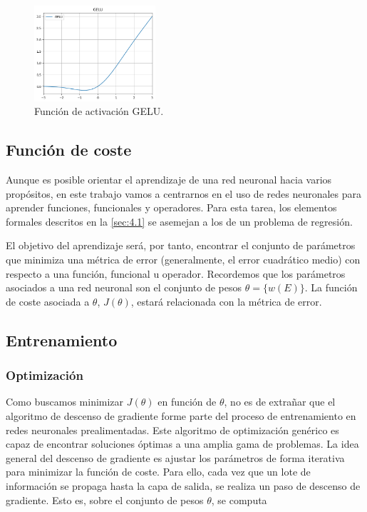 \begin{itemize}
    \begin{figure}[htbp]
        \centering
        \includegraphics[width=0.4\textwidth]{img/img25.png}
        \caption{Función de activación GELU.}
        \label{fig:img25}
    \end{figure}
\end{itemize}

\subsection{Función de coste}

Aunque es posible orientar el aprendizaje de una red neuronal hacia varios propósitos, en este trabajo vamos a centrarnos en el uso de redes neuronales para aprender funciones, funcionales y operadores. Para esta tarea, los elementos formales descritos en la \autoref{sec:4.1} se asemejan a los de un problema de regresión.

El objetivo del aprendizaje será, por tanto, encontrar el conjunto de parámetros que minimiza una métrica de error (generalmente, el error cuadrático medio) con respecto a una función, funcional u operador. Recordemos que los parámetros asociados a una red neuronal son el conjunto de pesos $\theta = \{ w(E) \}$. La función de coste asociada a $\theta$, $J(\theta)$, estará relacionada con la métrica de error.


\subsection{Entrenamiento}

\subsubsection{Optimización}\label{sec:4.3.3.1}
Como buscamos minimizar $J(\theta)$ en función de $\theta$, no es de extrañar que el algoritmo de descenso de gradiente forme parte del proceso de entrenamiento en redes neuronales prealimentadas. Este algoritmo de optimización genérico es capaz de encontrar soluciones óptimas a una amplia gama de problemas. La idea general del descenso de gradiente es ajustar 
los parámetros de forma iterativa para minimizar la función de 
coste. Para ello, cada vez que un lote de información se propaga hasta la capa de salida, se realiza un paso de descenso de gradiente. Esto es, sobre el conjunto de pesos $\theta$, se computa 

